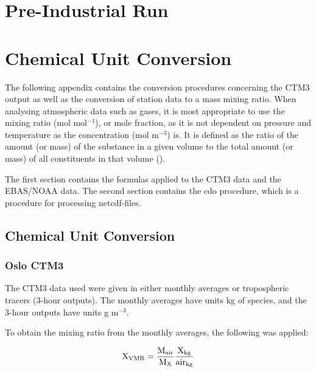 \cleardoublepage

\chapter{Pre-Industrial Run}\label{app:PI_run}



\cleardoublepage

\chapter{Chemical Unit Conversion}

The following appendix contains the conversion procedures concerning the CTM3 output as well as the conversion of station data to a mass mixing ratio. When analysing atmospheric data such as gases, it is most appropriate to use the mixing ratio (mol mol$^{-1}$), or mole fraction, as it is not dependent on pressure and temperature as the concentration (mol m$^{-3}$) is. It is defined as the ratio of the amount (or mass) of the substance in a given volume to the total amount (or mass) of all constituents in that volume (\cite{SeinfeldSpyros}). 

\medskip

The first section contains the formulas applied to the CTM3 data and the EBAS/NOAA data. The second section contains the \acrfull{cdo} procedure, which is a procedure for processing \acrshort{netcdf}-files. 

\section{Chemical Unit Conversion}

\subsection{Oslo CTM3}\label{sec:unit_conversion_CTM3}

The CTM3 data used were given in either monthly averages or tropospheric tracers (3-hour outputs). The monthly averages have units kg of species, and the 3-hour outputs have units g m$^{-3}$. 

\medskip

To obtain the mixing ratio from the monthly averages, the following was applied:

\begin{equation}
    \mathrm{X_{VMR}} = \frac{\mathrm{M_{air}}}{\mathrm{M_{X}}}\frac{\mathrm{X_{kg}}}{\mathrm{air_{kg}}}
    \label{eq:vmr_monthly_avg}
\end{equation}


